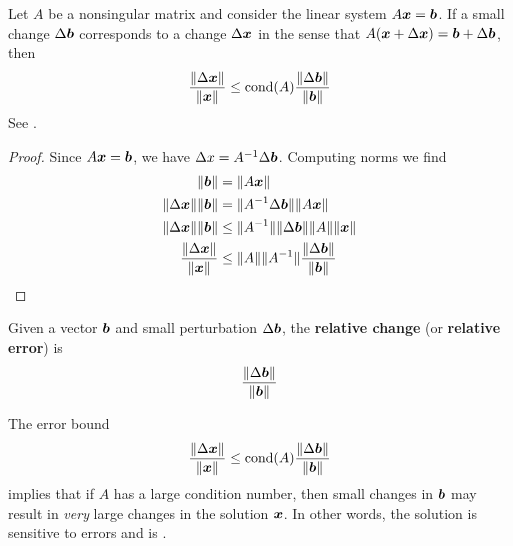\begin{proposition}
Let $A$ be a nonsingular matrix and consider the linear system $A \boldsymbol{x} = \boldsymbol{b}$. If a small change $\Delta \boldsymbol{b}$ corresponds to a change $\Delta \boldsymbol{x}$ in the sense that $A(\boldsymbol{x} + \Delta \boldsymbol{x}) = \boldsymbol{b} + \Delta \boldsymbol{b}$, then
$$
\frac{\| \Delta \boldsymbol{x} \|}{\| \boldsymbol{x} \|} \leq \mathrm{cond}(A) \frac{\| \Delta \boldsymbol{b} \|}{\| \boldsymbol{b} \|}
$$
See  \cite[p.58]{MH}.

\begin{proof}
Since $A \boldsymbol{x} = \boldsymbol{b}$, we have $\Delta x = A^{-1} \Delta \boldsymbol{b}$. Computing norms we find
\begin{align*}
\| \boldsymbol{b} \| &= \| A \boldsymbol{x} \| \\
\| \Delta \boldsymbol{x} \| \| \boldsymbol{b} \| &= \| A^{-1} \Delta \boldsymbol{b} \| \| A \boldsymbol{x} \| \\
\| \Delta \boldsymbol{x} \| \| \boldsymbol{b} \| &\leq \| A^{-1} \| \| \Delta\boldsymbol{b} \| \| A \| \| \boldsymbol{x} \| \\
\frac{\| \Delta \boldsymbol{x} \|}{ \| \boldsymbol{x} \|}  &\leq  \| A \| \| A^{-1} \| \frac{\| \Delta \boldsymbol{b} \|}{\| \boldsymbol{b} \|}
\end{align*}
\end{proof}
\end{proposition}

\begin{definition}
Given a vector $\boldsymbol{b}$ and small perturbation $\Delta \boldsymbol{b}$, the {\bf relative change} (or {\bf relative error}) is
$$
\frac{\| \Delta \boldsymbol{b} \|}{\| \boldsymbol{b} \|}
$$
\end{definition}

\begin{note}
The error bound
$$
\frac{\| \Delta \boldsymbol{x} \|}{\| \boldsymbol{x} \|} \leq \mathrm{cond}(A) \frac{\| \Delta \boldsymbol{b} \|}{\| \boldsymbol{b} \|}
$$
implies that if $A$ has a large condition number, then small changes in $\boldsymbol{b}$ may result in {\it very} large changes in the solution $\boldsymbol{x}$. In other words, the solution is sensitive to errors and is {}.
\end{note}